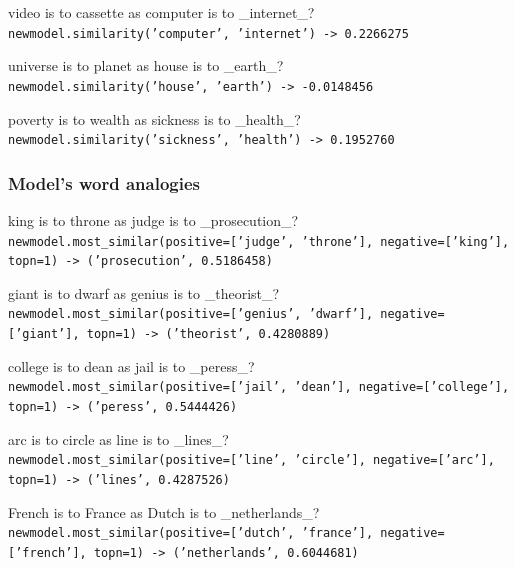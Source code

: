 \documentclass[
	letterpaper, %
]{jdf}
\begin{document}
\vspace{1em}

video is to cassette as computer is to \_internet\_?\\
\texttt{newmodel.similarity('computer', 'internet') -> 0.2266275}

\vspace{1em}

universe is to planet as house is to \_earth\_?\\
\texttt{newmodel.similarity('house', 'earth') -> -0.0148456}

\vspace{1em}

poverty is to wealth as sickness is to \_health\_?\\
\texttt{newmodel.similarity('sickness', 'health') -> 0.1952760}

\subsubsection{Model's word analogies}

king is to throne as judge is to \_prosecution\_?\\
\texttt{newmodel.most\_similar(positive=['judge', 'throne'], negative=['king'], topn=1) -> ('prosecution', 0.5186458)}

\vspace{1em}

giant is to dwarf as genius is to \_theorist\_?\\
\texttt{newmodel.most\_similar(positive=['genius', 'dwarf'], negative=['giant'], topn=1) -> ('theorist', 0.4280889)}

\vspace{1em}

college is to dean as jail is to \_peress\_?\\
\texttt{newmodel.most\_similar(positive=['jail', 'dean'], negative=['college'], topn=1) -> ('peress', 0.5444426)}

\vspace{1em}

arc is to circle as line is to \_lines\_?\\
\texttt{newmodel.most\_similar(positive=['line', 'circle'], negative=['arc'], topn=1) -> ('lines', 0.4287526)}

\vspace{1em}

French is to France as Dutch is to \_netherlands\_?\\
\texttt{newmodel.most\_similar(positive=['dutch', 'france'], negative=['french'], topn=1) -> ('netherlands', 0.6044681)}
\end{document}
